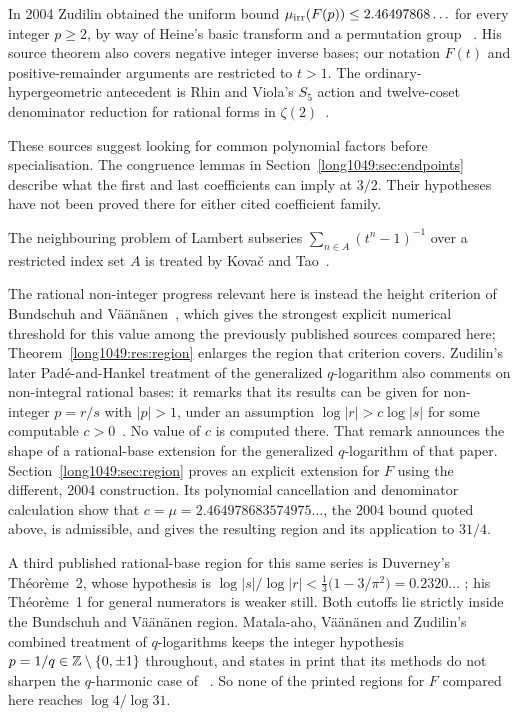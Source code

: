 \documentclass[11pt]{article}
\begin{document}
In 2004 Zudilin obtained the uniform bound
$\mu_{\rm irr}(F(p))\le2.46497868\ldots$ for every integer $p\ge2$,
by way of Heine's basic transform and a permutation group
~\cite[Thm.~1, p.~154; Secs.~4--5, pp.~159--162]{zudilin2004}.
His source theorem also covers negative integer inverse bases; our
notation $F(t)$ and positive-remainder arguments are restricted to $t>1$.
The ordinary-hypergeometric antecedent is Rhin and Viola's $S_5$ action and
twelve-coset denominator reduction for rational forms in
$\zeta(2)$~\cite[Sec.~3, pp.~38--42; Sec.~4, pp.~46--51]{rhinviola1996}.

These sources suggest looking for common polynomial factors before
specialisation. The congruence lemmas in
Section~\ref{long1049:sec:endpoints} describe what the first and last
coefficients can imply at $3/2$. Their hypotheses have not been proved
there for either cited coefficient family.

The neighbouring problem of Lambert
subseries $\sum_{n\in A}(t^{n}-1)^{-1}$ over a restricted index set $A$ is
treated by Kova\v{c} and Tao~\cite[Sec.~2.1.2 and Thm.~2.3, pp.~4--5]{kovactao2024}.

The rational non-integer
progress relevant here is instead the height criterion of Bundschuh and
V\"a\"an\"anen~\cite[Thm.~2, p.~177]{bv1994}, which gives the strongest explicit
numerical threshold for this value among the previously published sources
compared here; Theorem~\ref{long1049:res:region} enlarges the region that
criterion covers.  Zudilin's later Pad\'e-and-Hankel treatment of the generalized
$q$-logarithm also comments on non-integral rational bases: it remarks that its results can be
given for non-integer $p=r/s$ with $|p|>1$, under an assumption
$\log|r|>c\log|s|$ for some computable
$c>0$~\cite[Sec.~2, p.~4]{zudilin2016}.  No value of $c$ is computed there.  That remark
announces the shape of a rational-base extension for the generalized
$q$-logarithm of that paper.  Section~\ref{long1049:sec:region} proves an explicit extension for
$F$ using the different, 2004 construction. Its polynomial cancellation
and denominator calculation show that
$c=\mu=2.464978683574975\ldots$, the 2004 bound quoted above, is admissible,
and gives the resulting region and its application to $31/4$.

A third published rational-base region for this same series is Duverney's
Th\'eor\`eme~2, whose hypothesis is
$\log|s|/\log|r|<\frac13\bigl(1-3/\pi^{2}\bigr)=0.2320\ldots$
\cite[Th\'eor\`eme~2, p.~174]{duverney1996}; his Th\'eor\`eme~1 for general
numerators is weaker still.  Both cutoffs lie strictly inside the Bundschuh and
V\"a\"an\"anen region.  Matala-aho, V\"a\"an\"anen and Zudilin's combined
treatment of $q$-logarithms keeps the integer hypothesis $p=1/q\in\mathbb{Z}\mathbin{\backslash}\{0,\pm1\}$
throughout, and states in print that its methods do not sharpen the
$q$-harmonic case of~\cite{zudilin2004}
\cite[abstract p.~879; introduction p.~880]{matalaaho2006}.  So none of the
printed regions for $F$ compared here reaches $\log4/\log31$.
\end{document}
